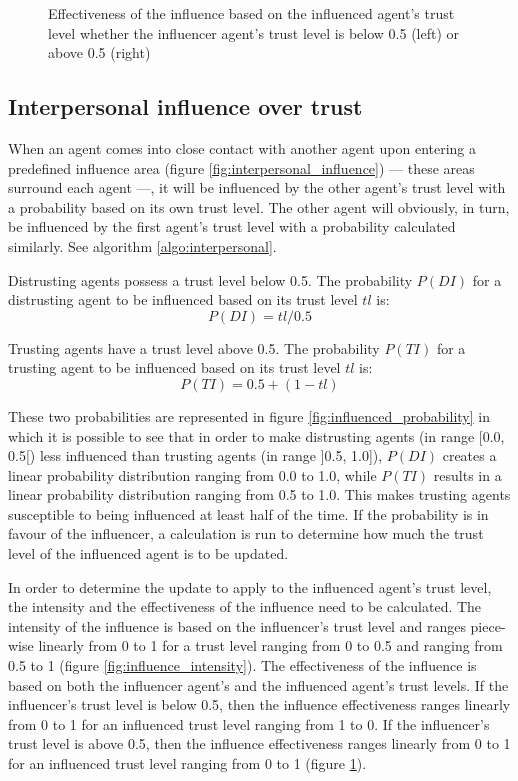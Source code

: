 \begin{figure}[!htb]
        \endminipage
        \captionsetup{width=0.82\linewidth}
        \caption{Effectiveness of the influence based on the influenced agent's trust level whether the influencer agent's trust level is below 0.5 (left) or above 0.5 (right)}
        \label{fig:influence_effectiveness}
    \endminipage
\end{figure}

\pagebreak

\subsection{Interpersonal influence over trust}
When an agent comes into close contact with another agent upon entering a predefined influence area (figure \ref{fig:interpersonal_influence}) --- these areas surround each agent ---, it will be influenced by the other agent's trust level with a probability based on its own trust level. The other agent will obviously, in turn, be influenced by the first agent's trust level with a probability calculated similarly. See algorithm \ref{algo:interpersonal}.

Distrusting agents possess a trust level below 0.5. The probability $P(DI)$ for a distrusting agent to be influenced based on its trust level $tl$ is:
\[P(DI) = tl / 0.5\]

Trusting agents have a trust level above 0.5. The probability $P(TI)$ for a trusting agent to be influenced based on its trust level $tl$ is:
\[P(TI) = 0.5 + (1 - tl)\]

These two probabilities are represented in figure \ref{fig:influenced_probability} in which it is possible to see that in order to make distrusting agents (in range [0.0, 0.5[) less influenced than trusting agents (in range ]0.5, 1.0]), $P(DI)$ creates a linear probability distribution ranging from 0.0 to 1.0, while $P(TI)$ results in a linear probability distribution ranging from 0.5 to 1.0. This makes trusting agents susceptible to being influenced at least half of the time. If the probability is in favour of the influencer, a calculation is run to determine how much the trust level of the influenced agent is to be updated.

In order to determine the update to apply to the influenced agent's trust level, the intensity and the effectiveness of the influence need to be calculated. The intensity of the influence is based on the influencer's trust level and ranges piece-wise linearly from 0 to 1 for a trust level ranging from 0 to 0.5 and ranging from 0.5 to 1 (figure \ref{fig:influence_intensity}). The effectiveness of the influence is based on both the influencer agent's and the influenced agent's trust levels. If the influencer's trust level is below 0.5, then the influence effectiveness ranges linearly from 0 to 1 for an influenced trust level ranging from 1 to 0. If the influencer's trust level is above 0.5, then the influence effectiveness ranges linearly from 0 to 1 for an influenced trust level ranging from 0 to 1 (figure \ref{fig:influence_effectiveness}).

